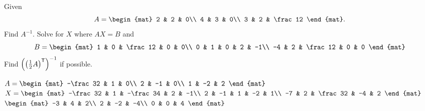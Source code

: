 

\begin{Exercise}[
name={},
title={}, 
difficulty=0,
origin={\cite{YL}}]
Given
\[
A=
\begin{mat}
2 & 2 & 0\\
4 & 3 & 0\\
3 & 2 & \frac12
\end{mat}.
\]
\Question Find $A^{-1}$.
\Question Solve for $X$ where $AX=B$ and 
\[
B=
\begin{mat}
1  & 0 & \frac12 & 0 & 0\\
0  & 1 & 0 & 2 & -1\\
-4 & 2 & \frac12 & 0 & 0
\end{mat}
\]
\Question Find $\left({{\left(\frac12A\right)}^{\mathsf{T}}}\right)^{-1}$ if possible.
\end{Exercise}

\begin{Answer}
\Question
$
A=
\begin{mat}
-\frac32 & 1 & 0\\
2 & -1 & 0\\
1 & -2 & 2
\end{mat}
$
\Question
$
X=
\begin{mat}
-\frac32 & 1 & -\frac34 & 2 & -1\\
2 & -1 & 1 & -2 & 1\\
-7 & 2 & \frac32 & -4 & 2
\end{mat}
$
\Question
$
\begin{mat}
-3 & 4 & 2\\
2 & -2 & -4\\
0 & 0 & 4
\end{mat}
$
\end{Answer}
